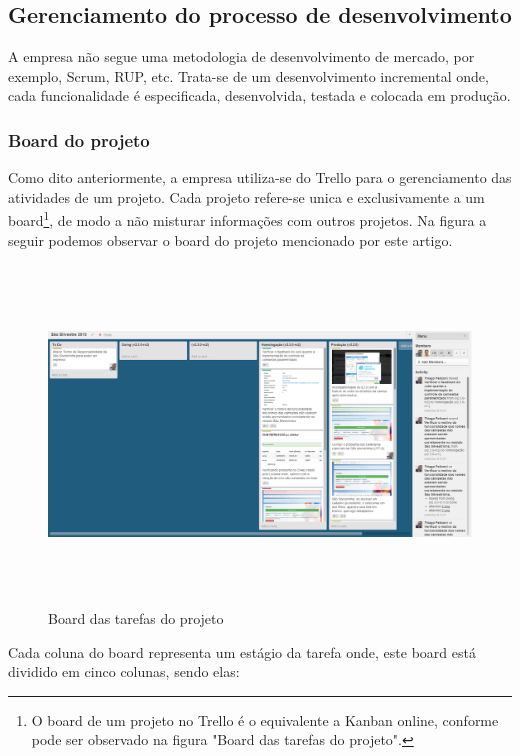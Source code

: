 \documentclass[11pt, a4paper]{article}
\begin{document}
\subsection{Gerenciamento do processo de desenvolvimento}
A empresa não segue uma metodologia de desenvolvimento de mercado, por exemplo, Scrum, RUP, etc. Trata-se de um desenvolvimento incremental onde, cada funcionalidade é especificada, desenvolvida, testada e colocada em produção.

\subsubsection{Board do projeto}

Como dito anteriormente, a empresa utiliza-se do Trello para o gerenciamento das atividades de um projeto. Cada projeto refere-se unica e exclusivamente a um board\footnote{O board de um projeto no Trello é o equivalente a Kanban online, conforme pode ser observado na figura "Board das tarefas do projeto".}, de modo a não misturar informações com outros projetos. Na figura a seguir podemos observar o board do projeto mencionado por este artigo.

\begin{figure}[H]
  \caption{Board das tarefas do projeto}
  \centering 
  \includegraphics[width=160mm,height=90mm]{images/board.png}
\end{figure}

Cada coluna do board representa um estágio da tarefa onde, este board está dividido em cinco colunas, sendo elas:
\end{document}
